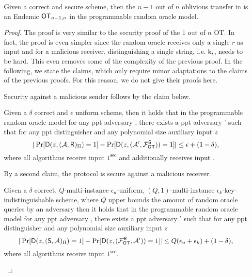 \begin{lemma}\label{lem:allbutone}
Given a correct and secure \UKA scheme, then the $n-1$ out of $n$ oblivious transfer in   is an Endemic $\mathsf{OT}_{n-1,n}$ in the programmable random oracle model. 
\end{lemma}

\begin{proof}
The proof is very similar to the security proof of the $1$ out of $n$ OT. In fact, the proof is even simpler since the random oracle receives only a single $r$ as input and for a malicious receiver, distinguishing a single string, i.e. $\mathsf{k}_{i}$, needs to be hard. This even removes some of the complexity of the previous proof. In the following, we state the claims, which only require minor adaptations to the claims of the previous proofs. For this reason, we do not give their proofs here. 

Security against a malicious sender follows by the claim below. 
\begin{claim}\label{claim:malsender}
Given a $\delta$ correct and $\epsilon$ uniform \UKA scheme, then it holds that in the programmable random oracle model for any ppt adversary \Adv, there exists a ppt adversary \Adv' such that for any ppt distinguisher \D and any polynomial size auxiliary input $z$
$$
|\Pr[\mathsf D(z,(\mathcal{A},\mathsf{R})_{\Pi})=1] -\Pr[\mathsf D(z, (\mathcal{A}', \mathcal{F}_{\mathsf{OT}}^\mathsf{S}))=1]|\leq \epsilon+(1-\delta),
$$
where all algorithms receive input $1^\sec$ and \rec additionally receives input \set.
\end{claim}


By a second claim, the protocol is secure against a malicious receiver.
\begin{claim}\label{claim:malreceiver}
Given a $\delta$ correct,  $Q$-multi-instance $\epsilon_u$-uniform,  $(Q,1)$-multi-instance $\epsilon_k$-key-indistinguishable  \UKA scheme, where $Q$ upper bounds the amount of random oracle queries by an adversary then it holds that in the programmable random oracle model for any ppt adversary \Adv, there exists a ppt adversary \Adv' such that for any ppt distinguisher \D and any polynomial size auxiliary input $z$
$$
|\Pr[\mathsf D(z,(\mathsf{S}, \mathcal{A})_{\Pi})=1] -\Pr[\mathsf D(z,(\mathcal{F}_{\mathsf{OT}}^\mathsf{R},\mathcal{A}'))=1]|\leq Q(\epsilon_{u}+\epsilon_{k})+(1-\delta),
$$
where all algorithms receive input $1^\sec$.
\end{claim}
\pe
\end{proof}

